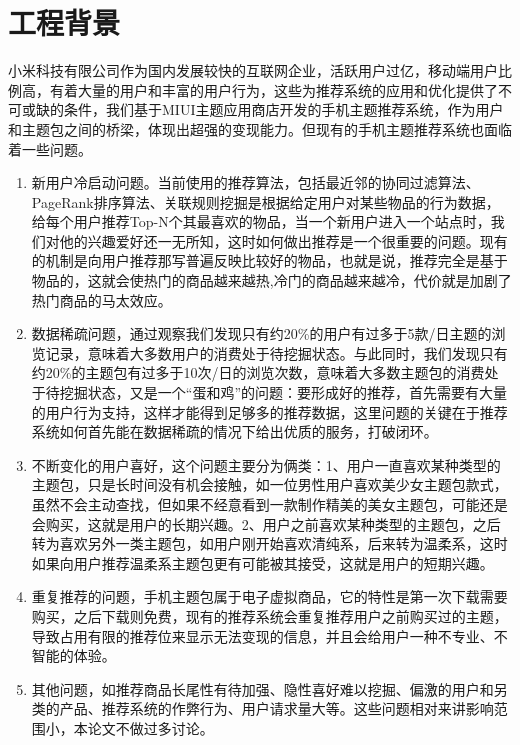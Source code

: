 \section{工程背景}
	小米科技有限公司作为国内发展较快的互联网企业，活跃用户过亿，移动端用户比例高，有着大量的用户和丰富的用户行为，这些为推荐系统的应用和优化提供了不可或缺的条件，我们基于MIUI主题应用商店开发的手机主题推荐系统，作为用户和主题包之间的桥梁，体现出超强的变现能力。但现有的手机主题推荐系统也面临着一些问题。
	\begin{enumerate}[(1)]
	\item 新用户冷启动问题。当前使用的推荐算法，包括最近邻的协同过滤算法、PageRank排序算法、关联规则挖掘是根据给定用户对某些物品的行为数据，给每个用户推荐Top-N个其最喜欢的物品，当一个新用户进入一个站点时，我们对他的兴趣爱好还一无所知，这时如何做出推荐是一个很重要的问题。现有的机制是向用户推荐那写普遍反映比较好的物品，也就是说，推荐完全是基于物品的，这就会使热门的商品越来越热,冷门的商品越来越冷，代价就是加剧了热门商品的马太效应。

	\item 数据稀疏问题，通过观察我们发现只有约20\%的用户有过多于5款/日主题的浏览记录，意味着大多数用户的消费处于待挖掘状态。与此同时，我们发现只有约20\%的主题包有过多于10次/日的浏览次数，意味着大多数主题包的消费处于待挖掘状态，又是一个“蛋和鸡”的问题：要形成好的推荐，首先需要有大量的用户行为支持，这样才能得到足够多的推荐数据，这里问题的关键在于推荐系统如何首先能在数据稀疏的情况下给出优质的服务，打破闭环。

	\item 不断变化的用户喜好，这个问题主要分为俩类：1、用户一直喜欢某种类型的主题包，只是长时间没有机会接触，如一位男性用户喜欢美少女主题包款式，虽然不会主动查找，但如果不经意看到一款制作精美的美女主题包，可能还是会购买，这就是用户的长期兴趣。2、用户之前喜欢某种类型的主题包，之后转为喜欢另外一类主题包，如用户刚开始喜欢清纯系，后来转为温柔系，这时如果向用户推荐温柔系主题包更有可能被其接受，这就是用户的短期兴趣。

	\item 重复推荐的问题，手机主题包属于电子虚拟商品，它的特性是第一次下载需要购买，之后下载则免费，现有的推荐系统会重复推荐用户之前购买过的主题，导致占用有限的推荐位来显示无法变现的信息，并且会给用户一种不专业、不智能的体验。

	\item 其他问题，如推荐商品长尾性\citep{long-tail}有待加强、隐性喜好\citep{latent-cf}难以挖掘、偏激的用户和另类的产品、推荐系统的作弊行为、用户请求量大等。这些问题相对来讲影响范围小，本论文不做过多讨论。
	\end{enumerate}

